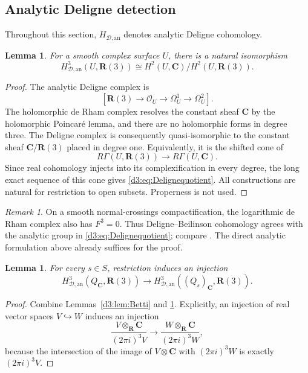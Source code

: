 \documentclass[11pt,a4paper]{amsart}
\numberwithin{equation}{section}
\newtheorem{lemma}[theorem]{Lemma}
\theoremstyle{definition}
\theoremstyle{remark}
\newtheorem{remark}[theorem]{Remark}
\newcommand{\R}{\mathbf R}
\newcommand{\C}{\mathbf C}
\newcommand{\OO}{\mathcal O}
\newcommand{\HD}{H_{\mathcal D,\mathrm{an}}}
\begin{document}
\subsection{Analytic Deligne detection}\label{d3:sec:Delignedetection}

Throughout this section, $\HD$ denotes analytic Deligne cohomology.

\begin{lemma}\label{d3:lem:Deligne}
For a smooth complex surface $U$, there is a natural isomorphism
\begin{equation}\label{d3:eq:Delignequotient}
\HD^3(U,\R(3))
\cong H^2(U,\C)/H^2(U,\R(3)).
\end{equation}
\end{lemma}
\begin{proof}
The analytic Deligne complex is
\[
[\R(3)\longrightarrow\OO_U\longrightarrow\Omega_U^1\longrightarrow\Omega_U^2].
\]
The holomorphic de Rham complex resolves the constant sheaf $\C$ by the holomorphic Poincar\'e lemma, and there are no holomorphic forms in degree three. The Deligne complex is consequently quasi-isomorphic to the constant sheaf $\C/\R(3)$ placed in degree one. Equivalently, it is the shifted cone of
\[
R\Gamma(U,\R(3))\longrightarrow R\Gamma(U,\C).
\]
Since real cohomology injects into its complexification in every degree, the long exact sequence of this cone gives \eqref{d3:eq:Delignequotient}. All constructions are natural for restriction to open subsets. Properness is not used.
\end{proof}

\begin{remark}
On a smooth normal-crossings compactification, the logarithmic de Rham complex also has $F^3=0$. Thus Deligne--Beilinson cohomology agrees with the analytic group in \eqref{d3:eq:Delignequotient}; compare \cite[Remark~2.13]{EsnaultViehweg}. The direct analytic formulation above already suffices for the proof.
\end{remark}

\begin{lemma}\label{d3:lem:Deligneinject}
For every $s\in S$, restriction induces an injection
\[
\HD^3(Q_{\C},\R(3))\longrightarrow\HD^3((Q_s)_{\C},\R(3)).
\]
\end{lemma}
\begin{proof}
Combine Lemmas~\ref{d3:lem:Betti} and \ref{d3:lem:Deligne}. Explicitly, an injection of real vector spaces $V\hookrightarrow W$ induces an injection
\[
\frac{V\otimes_{\R}\C}{(2\pi i)^3V}
\longrightarrow
\frac{W\otimes_{\R}\C}{(2\pi i)^3W},
\]
because the intersection of the image of $V\otimes\C$ with $(2\pi i)^3W$ is exactly $(2\pi i)^3V$.
\end{proof}
\end{document}
